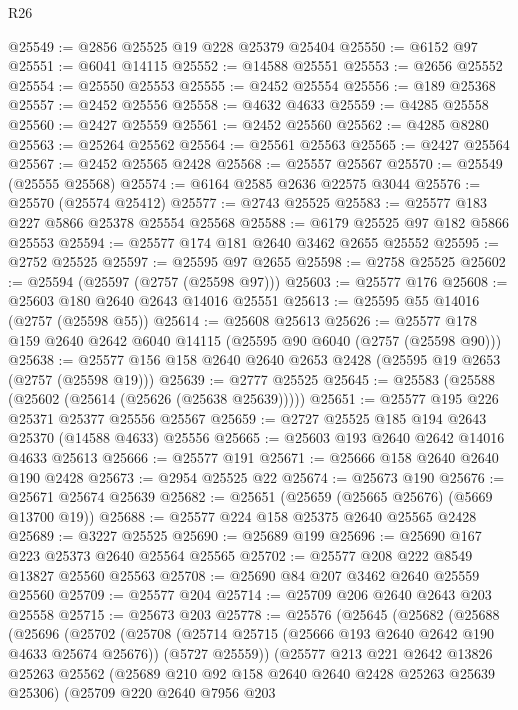 \begin{lexlean}{R26}
\begin{coremodule}
@25549 := @2856 @25525 @19 @228 @25379 @25404
@25550 := @6152 @97
@25551 := @6041 @14115
@25552 := @14588 @25551
@25553 := @2656 @25552
@25554 := @25550 @25553
@25555 := @2452 @25554
@25556 := @189 @25368
@25557 := @2452 @25556
@25558 := @4632 @4633
@25559 := @4285 @25558
@25560 := @2427 @25559
@25561 := @2452 @25560
@25562 := @4285 @8280
@25563 := @25264 @25562
@25564 := @25561 @25563
@25565 := @2427 @25564
@25567 := @2452 @25565 @2428
@25568 := @25557 @25567
@25570 := @25549 (@25555 @25568)
@25574 := @6164 @2585 @2636 @22575 @3044
@25576 := @25570 (@25574 @25412)
@25577 := @2743 @25525
@25583 := @25577 @183 @227 @5866 @25378 @25554 @25568
@25588 := @6179 @25525 @97 @182 @5866 @25553
@25594 := @25577 @174 @181 @2640 @3462 @2655 @25552
@25595 := @2752 @25525
@25597 := @25595 @97 @2655
@25598 := @2758 @25525
@25602 := @25594 (@25597 (@2757 (@25598 @97)))
@25603 := @25577 @176
@25608 := @25603 @180 @2640 @2643 @14016 @25551
@25613 := @25595 @55 @14016 (@2757 (@25598 @55))
@25614 := @25608 @25613
@25626 := @25577 @178 @159 @2640 @2642 @6040 @14115 (@25595 @90 @6040 (@2757 (@25598 @90)))
@25638 := @25577 @156 @158 @2640 @2640 @2653 @2428 (@25595 @19 @2653 (@2757 (@25598 @19)))
@25639 := @2777 @25525
@25645 := @25583 (@25588 (@25602 (@25614 (@25626 (@25638 @25639)))))
@25651 := @25577 @195 @226 @25371 @25377 @25556 @25567
@25659 := @2727 @25525 @185 @194 @2643 @25370 (@14588 @4633) @25556
@25665 := @25603 @193 @2640 @2642 @14016 @4633 @25613
@25666 := @25577 @191
@25671 := @25666 @158 @2640 @2640 @190 @2428
@25673 := @2954 @25525 @22
@25674 := @25673 @190
@25676 := @25671 @25674 @25639
@25682 := @25651 (@25659 (@25665 @25676) (@5669 @13700 @19))
@25688 := @25577 @224 @158 @25375 @2640 @25565 @2428
@25689 := @3227 @25525
@25690 := @25689 @199
@25696 := @25690 @167 @223 @25373 @2640 @25564 @25565
@25702 := @25577 @208 @222 @8549 @13827 @25560 @25563
@25708 := @25690 @84 @207 @3462 @2640 @25559 @25560
@25709 := @25577 @204
@25714 := @25709 @206 @2640 @2643 @203 @25558
@25715 := @25673 @203
@25778 := @25576
    (@25645
      (@25682
        (@25688
          (@25696
            (@25702
              (@25708
                (@25714 @25715 (@25666 @193 @2640 @2642 @190 @4633 @25674 @25676))
                (@5727 @25559))
              (@25577
                @213
                @221
                @2642
                @13826
                @25263
                @25562
                (@25689 @210 @92 @158 @2640 @2640 @2428 @25263 @25639 @25306)
                (@25709
                  @220
                  @2640
                  @7956
                  @203

\end{coremodule}
\end{lexlean}

